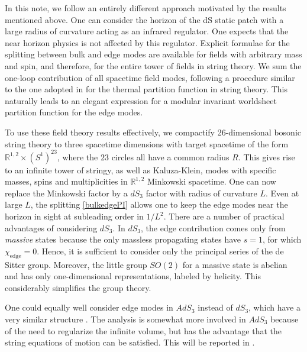 \documentclass[aps,prl, reprint, superscriptaddress, 10pt]{revtex4-2}
\newcommand{\1}{\textbf{1}}
\newcommand{\+}{{\,+ \,}}
\begin{document}
In this note, we follow an entirely different approach motivated by the results mentioned above. One can consider the horizon of the dS static patch with a large radius of curvature acting as an infrared regulator. One expects that the near horizon physics is not affected by this regulator.
Explicit formulae for the splitting between bulk and edge modes are available for fields with arbitrary mass and spin, and therefore, for the entire tower of fields in string theory. We sum the one-loop contribution of all spacetime field modes, following a procedure similar to the one adopted in \cite{Polchinski:1985zf} for the thermal partition function in string theory.
This naturally leads to an elegant expression for a modular invariant worldsheet partition function for the edge modes.

To use these field theory results effectively, we compactify 26-dimensional bosonic string theory to three spacetime dimensions with target spacetime of the form $\mathbb{R}^{1,2}\times (S^1)^{23}$, where the $23$ circles all have a common radius $R$. This gives rise to an infinite tower of stringy, as well as Kaluza-Klein, modes with specific masses, spins and multiplicities in $\mathbb{R}^{1,2}$ Minkowski spacetime. One can now replace the Minkowski factor by a $dS_3$ factor with radius of curvature $L$. Even at large $L$, the splitting \eqref{bulkedgePI} allows one to keep the edge modes near the horizon in sight at subleading order in $1/L^2$. There are a number of practical advantages of considering $dS_3$. In $dS_3$, the edge contribution comes only from \textit{massive} states because the only massless propagating states have $s=1$, for which $\chi_{\text{edge}}=0$. Hence, it is sufficient to consider only the principal series of the de Sitter group. Moreover, the little group $SO(2)$ for a massive state is abelian and has only one-dimensional representations, labeled by helicity. This considerably simplifies the group theory.

One could equally well consider edge modes in $AdS_3$ instead of $dS_3$, which have a very similar structure \cite{Sun:2020ame}. The analysis is somewhat more involved in $AdS_3$ because of the need to regularize the infinite volume, but has the advantage that the string equations of motion can be satisfied. This will be reported in \cite{Dabholkar:2026WiP}.
\end{document}

